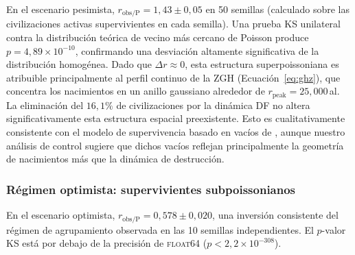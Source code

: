 \documentclass[11pt,a4paper,onecolumn]{article}
\begin{document}
En el escenario pesimista, $r_\text{obs/P} = 1{,}43 \pm 0{,}05$
en 50 semillas (calculado sobre las civilizaciones activas
supervivientes en cada semilla).
Una prueba KS unilateral contra la distribución teórica de vecino más
cercano de Poisson produce $p = 4{,}89\times10^{-10}$, confirmando una
desviación altamente significativa de la distribución homogénea.
Dado que $\Delta r \approx 0$, esta estructura superpoissoniana es
atribuible principalmente al perfil continuo de la ZGH
(Ecuación~\ref{eq:ghz}), que concentra los nacimientos en un anillo
gaussiano alrededor de $r_\text{peak} = 25{,}000$\,al.
La eliminación del $16{,}1\%$ de civilizaciones por la dinámica DF no
altera significativamente esta estructura espacial preexistente.
Esto es cualitativamente consistente con el modelo de supervivencia
basado en vacíos de \citet{forgan2011}, aunque nuestro análisis de
control sugiere que dichos vacíos reflejan principalmente la geometría de
nacimientos más que la dinámica de destrucción.

\subsubsection{Régimen optimista: supervivientes subpoissonianos}
\label{sec:inversion}

En el escenario optimista, $r_\text{obs/P} = 0{,}578 \pm 0{,}020$,
una inversión consistente del régimen de agrupamiento observada en las
10 semillas independientes.
El $p$-valor KS está por debajo de la precisión de \textsc{float64}
($p < 2{,}2\times10^{-308}$).
\end{document}
